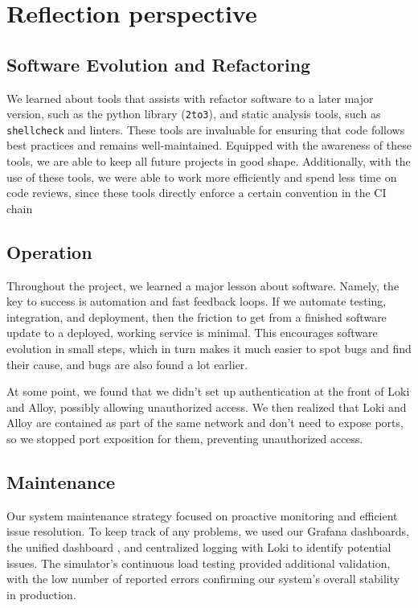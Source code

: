 \section{Reflection perspective} \label{rp}
\subsection{Software Evolution and Refactoring}
We learned about tools that assists with refactor software to a later major version, such as the python library (\texttt{2to3}), and static analysis tools, such as \texttt{shellcheck} and linters. These tools are invaluable for ensuring that code follows best practices and remains well-maintained. Equipped with the awareness of these tools, we are able to keep all future projects in good shape. Additionally, with the use of these tools, we were able to work more efficiently and spend less time on code reviews, since these tools directly enforce a certain convention in the CI chain


\subsection{Operation}
Throughout the project, we learned a major lesson about software. Namely, the key to success is automation and fast feedback loops. If we automate testing, integration, and deployment, then the friction to get from a finished software update to a deployed, working service is minimal. This encourages software evolution in small steps, which in turn makes it much easier to spot bugs and find their cause, and bugs are also found a lot earlier.

At some point, we found that we didn’t set up authentication at the front of Loki
and Alloy, possibly allowing unauthorized access. We then realized 
that Loki and Alloy are contained as part of the same network and don’t need to expose ports,
so we stopped port exposition for them, preventing unauthorized access.

\subsection{Maintenance} 
Our system maintenance strategy focused on proactive monitoring and efficient issue resolution. To keep track of any problems, we used our Grafana dashboards, the unified dashboard \parencite["Status for All Groups"]{dashboard}, and centralized logging with Loki to identify potential issues. The simulator's continuous load testing provided additional validation, with the low number of reported errors confirming our system's overall stability in production.

